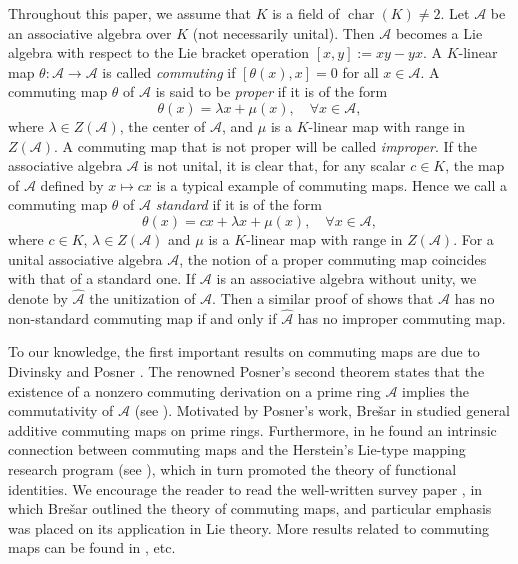 \documentclass[reqno]{amsart}
\theoremstyle{plain}
\theoremstyle{definition}
\begin{document}
Throughout this paper, we assume that $K$ is a field of $\operatorname{char} 
(K)\neq 2$. Let $\mathcal{A}$ be an associative algebra over $K$ (not necessarily unital). Then $\mathcal{A}$ becomes a Lie algebra with respect to the Lie bracket operation $[x, y]:=xy-yx$.
A $K$-linear map $\theta: \mathcal{A}\rightarrow \mathcal{A}$ is called {\em commuting} if $[\theta(x), x]=0$ for all $x\in \mathcal{A}$.
A commuting map $\theta$ of $\mathcal{A}$ is said to be {\em proper}
if it is of the form 
$$
\theta(x)=\lambda x+\mu(x), \quad \forall x\in \mathcal{A},
$$
where $\lambda\in Z(\mathcal{A})$, the center of $\mathcal{A}$, and $\mu$ is a $K$-linear map with range in $Z(\mathcal{A})$. A commuting map that is not proper will be called {\em improper}.
If the associative algebra $\mathcal{A}$ is not unital, it is clear that,
for any scalar $c\in K$, the map of $\mathcal{A}$ defined by $x \mapsto cx$ is a typical example of commuting maps. Hence we call a commuting map $\theta$ of $\mathcal{A}$ {\em standard} if it is of the form
$$
\theta(x)=cx+\lambda x +\mu(x), \quad \forall x\in \mathcal{A},
$$
where $c\in K$, $\lambda\in Z(\mathcal{A})$ and $\mu$ is a $K$-linear map with
range in $Z(\mathcal{A})$. For a unital associative algebra $\mathcal{A}$, the notion of a proper commuting map coincides with that of a standard one. If $\mathcal{A}$ is an associative algebra without unity, we denote by $\hat{\mathcal{A}}$ the unitization of $\mathcal{A}$. Then a similar proof of
\cite[Proposition 1]{Cheung} shows that $\mathcal{A}$ has no non-standard commuting map if and only if $\hat{\mathcal{A}}$ has no improper commuting map.


To our knowledge, the first important results on commuting maps are due to
Divinsky \cite{Divinsky} and Posner \cite{Posner}.
The renowned Posner's second theorem states that the existence of a nonzero commuting derivation on a prime ring $\mathcal{A}$ implies the commutativity of $\mathcal{A}$ (see \cite[Theorems 1 and 2]{Posner}).
Motivated by Posner's work, Bre\v{s}ar in \cite{Bre93-1} studied general additive commuting maps on prime rings.
Furthermore, in \cite{Bre93-2} he found an intrinsic connection between commuting maps and the Herstein's Lie-type mapping research program (see \cite{Her}), which in turn promoted the theory of functional identities.
We encourage the reader to read the well-written survey paper \cite{Bre04}, in which Bre\v{s}ar outlined the theory of commuting maps, and particular emphasis was placed
on its application in Lie theory.
More results related to commuting maps can be found in
\cite{Bre91, Bre94, ChenCai, fo1, Lee, LeeLee, XY}, etc.
\end{document}
